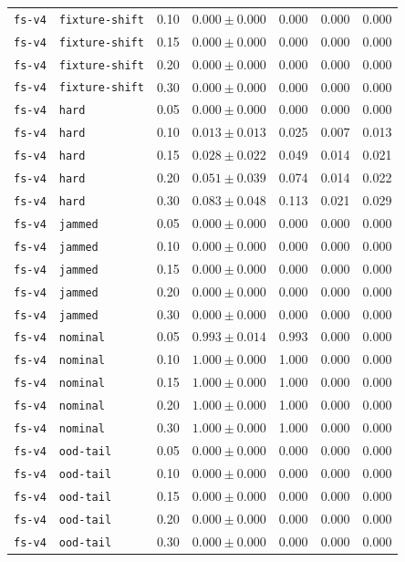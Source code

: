 \documentclass{article}
\begin{document}
\begin{center}
\begin{tabular}{lllcccc}
\texttt{fs-v4} & \texttt{fixture-shift} & 0.10 & $0.000 \pm 0.000$ & 0.000 & 0.000 & 0.000 \\
\texttt{fs-v4} & \texttt{fixture-shift} & 0.15 & $0.000 \pm 0.000$ & 0.000 & 0.000 & 0.000 \\
\texttt{fs-v4} & \texttt{fixture-shift} & 0.20 & $0.000 \pm 0.000$ & 0.000 & 0.000 & 0.000 \\
\texttt{fs-v4} & \texttt{fixture-shift} & 0.30 & $0.000 \pm 0.000$ & 0.000 & 0.000 & 0.000 \\
\texttt{fs-v4} & \texttt{hard} & 0.05 & $0.000 \pm 0.000$ & 0.000 & 0.000 & 0.000 \\
\texttt{fs-v4} & \texttt{hard} & 0.10 & $0.013 \pm 0.013$ & 0.025 & 0.007 & 0.013 \\
\texttt{fs-v4} & \texttt{hard} & 0.15 & $0.028 \pm 0.022$ & 0.049 & 0.014 & 0.021 \\
\texttt{fs-v4} & \texttt{hard} & 0.20 & $0.051 \pm 0.039$ & 0.074 & 0.014 & 0.022 \\
\texttt{fs-v4} & \texttt{hard} & 0.30 & $0.083 \pm 0.048$ & 0.113 & 0.021 & 0.029 \\
\texttt{fs-v4} & \texttt{jammed} & 0.05 & $0.000 \pm 0.000$ & 0.000 & 0.000 & 0.000 \\
\texttt{fs-v4} & \texttt{jammed} & 0.10 & $0.000 \pm 0.000$ & 0.000 & 0.000 & 0.000 \\
\texttt{fs-v4} & \texttt{jammed} & 0.15 & $0.000 \pm 0.000$ & 0.000 & 0.000 & 0.000 \\
\texttt{fs-v4} & \texttt{jammed} & 0.20 & $0.000 \pm 0.000$ & 0.000 & 0.000 & 0.000 \\
\texttt{fs-v4} & \texttt{jammed} & 0.30 & $0.000 \pm 0.000$ & 0.000 & 0.000 & 0.000 \\
\texttt{fs-v4} & \texttt{nominal} & 0.05 & $0.993 \pm 0.014$ & 0.993 & 0.000 & 0.000 \\
\texttt{fs-v4} & \texttt{nominal} & 0.10 & $1.000 \pm 0.000$ & 1.000 & 0.000 & 0.000 \\
\texttt{fs-v4} & \texttt{nominal} & 0.15 & $1.000 \pm 0.000$ & 1.000 & 0.000 & 0.000 \\
\texttt{fs-v4} & \texttt{nominal} & 0.20 & $1.000 \pm 0.000$ & 1.000 & 0.000 & 0.000 \\
\texttt{fs-v4} & \texttt{nominal} & 0.30 & $1.000 \pm 0.000$ & 1.000 & 0.000 & 0.000 \\
\texttt{fs-v4} & \texttt{ood-tail} & 0.05 & $0.000 \pm 0.000$ & 0.000 & 0.000 & 0.000 \\
\texttt{fs-v4} & \texttt{ood-tail} & 0.10 & $0.000 \pm 0.000$ & 0.000 & 0.000 & 0.000 \\
\texttt{fs-v4} & \texttt{ood-tail} & 0.15 & $0.000 \pm 0.000$ & 0.000 & 0.000 & 0.000 \\
\texttt{fs-v4} & \texttt{ood-tail} & 0.20 & $0.000 \pm 0.000$ & 0.000 & 0.000 & 0.000 \\
\texttt{fs-v4} & \texttt{ood-tail} & 0.30 & $0.000 \pm 0.000$ & 0.000 & 0.000 & 0.000 \\
\bottomrule
\end{tabular}
\end{center}
\end{document}
